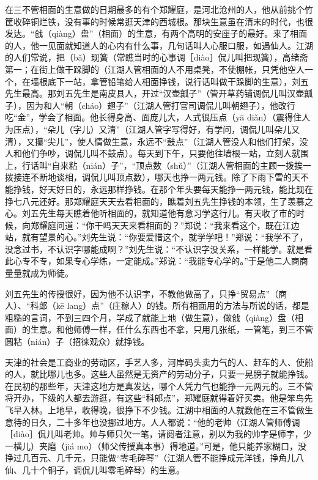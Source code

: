 \documentclass[12pt,UTF8]{ctexbook}
\begin{document}
在三不管相面的生意做的日期最多的有个郑耀庭，是河北沧州的人，他从前挑个竹筐收碎铜烂铁，没有事的时候常逛天津的西城根。那块生意虽在清末的时代，也很发达。“戗（qiàng）盘”（相面）的生意，有两个高明的安座子的最好。来了相面的人，他一见面就知道人的心内有什么事，几句话叫人心服口服，如遇仙人。江湖的人们常说，把（bǎ）现簧（常瞧当时的心事调［diào］侃儿叫把现簧），高绪斋第一；在街上做干跺脚的（江湖人管相面的人不用桌凳，不使棚帐，只凭他空人一个，在墙根底下一站，拿管铅笔给人相面挣钱，说行话叫做干跺脚的生意），刘五先生最高。那刘五先生是南皮县人，开过“汉壶瓤子”（管开草药铺调侃儿叫汉壶瓤子），因为和人“朝（cháo）翅子”（江湖人管打官司调侃儿叫朝翅子），他改行吃“金”，学会了相面。他长得身高、面庞儿大，人式很压点（yā diǎn）（震得住人为压点），“朵儿（字儿）又清”（江湖人管字写得好，有学问，调侃儿叫朵儿又清），又攥“尖儿”，使人情做生意，永远不“鼓点”（江湖人管没人和他们打架，没人和他们争吵，调侃儿叫不鼓点）。每天到下午，只要他往墙根一站，立刻人就围上，行话叫“自来粘（nián）子”，“顶点数（shǔ）”（江湖人管相面的主顾一拨挨一拨接连不断地谈相，调侃儿叫顶点数），哪天也挣一两元钱。除了下雨下雪的天不能挣钱，好天好日的，永远那样挣钱。在那个年头要每天能挣一两元钱，能比现在挣七八元还好。那郑耀庭天天去看相面的，瞧着刘五先生挣钱的本领，生了羡慕之心。刘五先生每天瞧着他听相面的，就知道他有意习学这行儿。有天收了市的时候，向郑耀庭问道：“你干吗天天来看相面的？”郑说：“我来看这个，既在江边站，就有望景的心。”刘先生说：“你要爱惜这个，就学学吧！”郑说：“我学不了，没念过书，不认识字哪能成啊？”刘先生说：“不认识字没关系，一样能学。就是看此心专不专，如果专心学练，一定能成。”郑说：“我能专心学的。”于是他二人商商量量就成为师徒。

刘五先生的传授很好，因为他不认识字，不教他做高了，只挣“贸易点”（商人）、“科郎（kē lang）点”（庄稼人）的钱。所有相面用的方法与所说的话，都是粗糙的言词，不到三四个月，学成了就能上地（做生意），做戗（qiàng）盘（相面）的生意。和他师傅一样，任什么东西也不拿，只用几张纸，一管笔，到三不管圆粘（nián）子（招徕观众）就挣钱。

天津的社会是工商业的劳动区，手艺人多，河岸码头卖力气的人、赶车的人、使船的人，就比哪儿也多。这些人虽然是无资产的劳动分子，只要一晃膀子就能挣钱。在民初的那些年，天津这地方是真发达，哪个人凭力气也能挣一元两元的。三不管将开办，下级的人都去游逛，有这些“科郎点”，郑耀庭就得着好买卖。他是笨鸟先飞早入林。上地早，收得晚，很挣下不少钱。江湖中相面的人就数他在三不管做生意待的日久，二十多年也没挪过地方。人人都说：“他的老帅（江湖人管师傅调［diào］侃儿叫老帅。帅与师只欠一笔，请阅者注意，别以为我的帅字是师字，少一横儿）夹磨（jiá mo）（师父传授真本事）得地道。”可是，他只能养家糊口，没挣过几百元、几千元，只能做“零毛碎琴”（江湖人管不能挣成元洋钱，挣角儿八仙、几十个铜子，调侃儿叫零毛碎琴）的生意。
\end{document}
